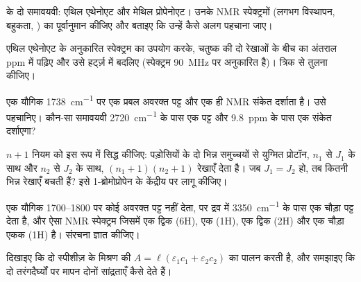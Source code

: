 \begin{exercise}[$\star\star$]\label{exo:b1:structure-spectroscopy:7}
 के दो समावयवी: एथिल एथेनोएट और मेथिल प्रोपेनोएट। उनके
NMR स्पेक्ट्रमों (लगभग विस्थापन, बहुकता, ) का पूर्वानुमान कीजिए
और बताइए कि उन्हें कैसे अलग पहचाना जाए।
\end{exercise}

\begin{exercise}[$\star\star$]\label{exo:b1:structure-spectroscopy:8}
एथिल एथेनोएट के अनुकारित स्पेक्ट्रम का उपयोग करके, चतुष्क की दो रेखाओं के बीच का
अंतराल ppm में पढ़िए और उसे हर्ट्ज़ में बदलिए (स्पेक्ट्रम
\qty{90}{MHz} पर अनुकारित है)। त्रिक से तुलना कीजिए।
\end{exercise}

\begin{exercise}[$\star\star$]\label{exo:b1:structure-spectroscopy:9}
एक यौगिक  \qty{1738}{cm^{-1}} पर एक प्रबल अवरक्त पट्ट और
एक ही NMR संकेत दर्शाता है। उसे पहचानिए। कौन-सा समावयवी
\qty{2720}{cm^{-1}} के पास एक पट्ट और \qty{9.8}{ppm} के पास एक संकेत दर्शाएगा?
\end{exercise}

\begin{exercise}[$\star\star\star$]\label{exo:b1:structure-spectroscopy:10}
$n + 1$ नियम को इस रूप में सिद्ध कीजिए: पड़ोसियों के दो भिन्न
समुच्चयों से युग्मित प्रोटॉन, $n_1$ से $J_1$ के साथ और $n_2$ से $J_2$ के साथ, $(n_1 +
1)(n_2 + 1)$ रेखाएँ देता है। जब $J_1 = J_2$ हो, तब कितनी भिन्न रेखाएँ बचती हैं?
इसे 1-ब्रोमोप्रोपेन के केंद्रीय  पर लागू कीजिए।
\end{exercise}

\begin{exercise}[$\star\star\star$]\label{exo:b1:structure-spectroscopy:11}
एक यौगिक  1700--1800 पर कोई अवरक्त पट्ट नहीं देता, पर द्रव में
\qty{3350}{cm^{-1}} के पास एक चौड़ा पट्ट देता है, और ऐसा NMR स्पेक्ट्रम जिसमें एक द्विक
(6H), एक  (1H), एक द्विक (2H) और एक चौड़ा एकक (1H) है।
संरचना ज्ञात कीजिए।
\end{exercise}

\begin{exercise}[$\star\star\star$]\label{exo:b1:structure-spectroscopy:12}
दिखाइए कि दो स्पीशीज़ के मिश्रण की  $A = \ell(\varepsilon_1c_1
+ \varepsilon_2c_2)$ का पालन करती है, और समझाइए कि दो तरंगदैर्घ्यों पर मापन
दोनों सांद्रताएँ कैसे देते हैं।
\end{exercise}

